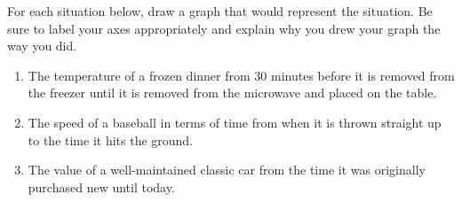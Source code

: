 \documentclass[nooutcomes,noauthor,handout]{ximera}
\begin{document}
\begin{problem}
For each situation below, draw a graph that would represent the situation. Be sure to label your axes appropriately and explain why you drew your graph the way you did.

\begin{enumerate}
	\item The temperature of a frozen dinner from 30 minutes before it is removed from the freezer until it is removed from the microwave and placed on the table.
	\item The speed of a baseball in terms of time from when it is thrown straight up to the time it hits the ground.
	\item The value of a well-maintained classic car from the time it was originally purchased new until today.
\end{enumerate}
\end{problem}



%
%
\end{document}
